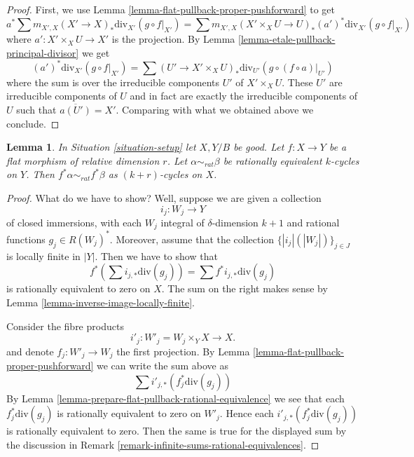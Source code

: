 \documentclass{stacks-project}
\theoremstyle{plain}
\newtheorem{lemma}[subsection]{Lemma}
\theoremstyle{definition}
\theoremstyle{remark}
\numberwithin{equation}{subsection}
\begin{document}
\begin{proof}
First, we use Lemma \ref{lemma-flat-pullback-proper-pushforward}
to get
$$
a^*\sum m_{X', X} (X' \to X)_*\text{div}_{X'}(g \circ f|_{X'}) =
\sum m_{X', X} (X' \times_X U \to U)_*(a')^*\text{div}_{X'}(g \circ f|_{X'})
$$
where $a' : X' \times_X U \to X'$ is the projection.
By Lemma \ref{lemma-etale-pullback-principal-divisor}
we get
$$
(a')^*\text{div}_{X'}(g \circ f|_{X'}) =
\sum (U' \to X' \times_X U)_*\text{div}_{U'}(g \circ (f \circ a)|_{U'})
$$
where the sum is over the irreducible components $U'$ of $X' \times_X U$.
These $U'$ are irreducible components of $U$ and in fact are exactly the
irreducible components of $U$ such that $\overline{a(U')} = X'$.
Comparing with what we obtained above we conclude.
\end{proof}

\begin{lemma}
\label{lemma-flat-pullback-rational-equivalence}
In Situation \ref{situation-setup} let $X, Y/B$ be good.
Let $f : X \to Y$ be a flat morphism of relative dimension $r$.
Let $\alpha \sim_{rat} \beta$ be rationally equivalent $k$-cycles
on $Y$. Then $f^*\alpha \sim_{rat} f^*\beta$ as $(k + r)$-cycles on $X$.
\end{lemma}

\begin{proof}
What do we have to show? Well, suppose we are given a collection
$$
i_j : W_j \longrightarrow Y
$$
of closed immersions, with each $W_j$ integral of $\delta$-dimension $k + 1$
and rational functions $g_j \in R(W_j)^*$. Moreover, assume that
the collection $\{|i_j|(|W_j|)\}_{j \in J}$ is locally finite in $|Y|$.
Then we have to show that
$$
f^*(\sum i_{j, *}\text{div}(g_j)) = \sum f^*i_{j, *}\text{div}(g_j)
$$
is rationally equivalent to zero on $X$. The sum on the right
makes sense by Lemma \ref{lemma-inverse-image-locally-finite}.

\medskip\noindent
Consider the fibre products
$$
i'_j : W'_j = W_j \times_Y X \longrightarrow X.
$$
and denote $f_j : W'_j \to W_j$ the first projection.
By Lemma \ref{lemma-flat-pullback-proper-pushforward}
we can write the sum above as
$$
\sum i'_{j, *}(f_j^*\text{div}(g_j))
$$
By Lemma \ref{lemma-prepare-flat-pullback-rational-equivalence}
we see that each $f_j^*\text{div}(g_j)$ is rationally equivalent
to zero on $W'_j$. Hence each $i'_{j, *}(f_j^*\text{div}(g_j))$
is rationally equivalent to zero. Then the same is true for
the displayed sum by the discussion in
Remark \ref{remark-infinite-sums-rational-equivalences}.
\end{proof}
\end{document}
